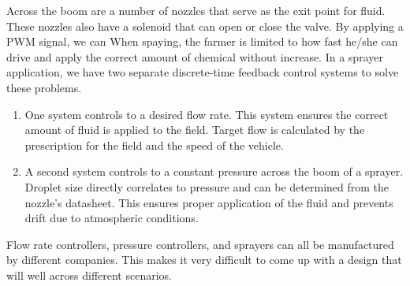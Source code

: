Across the boom are a number of nozzles that serve as the exit point for fluid.  These nozzles also have a solenoid that can open or close the valve.  By applying a PWM signal, we can  When spaying, the farmer is limited to how fast he/she can drive and apply the correct amount of chemical without increase. In a sprayer application, we have two separate discrete-time feedback control systems to solve these problems.

\begin{enumerate}
\item One system controls to a desired flow rate.  This system ensures the correct amount of fluid is applied to the field.  Target flow is calculated by the prescription for the field and the speed of the vehicle. 

\item A second system controls to a constant pressure across the boom of a sprayer.  Droplet size directly correlates to pressure and can be determined from the nozzle’s datasheet.  This ensures proper application of the fluid and prevents drift due to atmospheric conditions.  

\end{enumerate}

Flow rate controllers, pressure controllers, and sprayers can all be manufactured by  different companies.  This makes it very difficult to come up 
with a design that will  well across different
scenarios.   %
%

